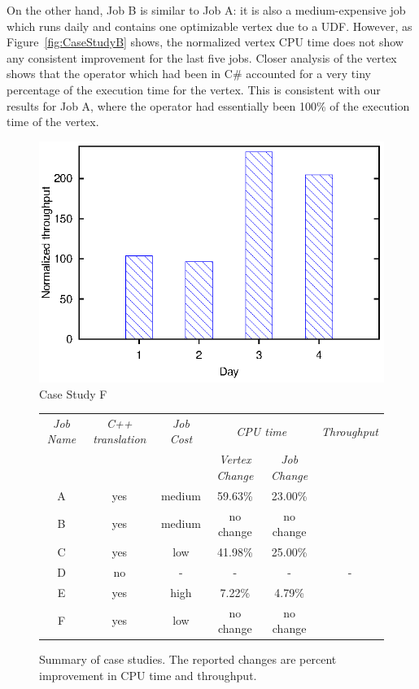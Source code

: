 On the other hand, Job B is similar to Job A: it is also a medium-expensive job which runs daily and contains one optimizable vertex due to a UDF.
However, as Figure~\ref{fig:CaseStudyB} shows, the normalized vertex CPU time does not show any consistent improvement for the last five jobs.
Closer analysis of the vertex shows that the operator which had been in C\# accounted for a very tiny percentage of the execution time for the vertex.
This is consistent with our results for Job A, where the operator had essentially been 100\% of the execution time of the vertex.
\begin{figure}[ht]
\includegraphics{graphs/throughtputF}
\caption{Case Study F \label{fig:CaseStudyF}}
\end{figure}
\begin{figure}[ht]

\begin{tabular}{c|c|c|c|c|c} 
\toprule
  {\em Job Name} & {\em C++ translation}&{\em Job Cost} & \multicolumn{2}{c}{\em CPU time} &  {\em Throughput } \\
  \cmidrule{4-5}  
  & & & {\em Vertex Change} & {\em Job Change} &  \\
  \midrule

A & yes & medium & 59.63\%  & 23.00\% & \todo{}\\
B &yes & medium & no change & no change & \todo{}\\
C & yes & low    & 41.98\%  & 25.00\% & \todo{}\\
D & no & - & - & - & -\\
E & yes & high   & 7.22\%   & 4.79\% & \todo{} \\
F & yes & low & no change & no change & \todo{}\\

\end{tabular}
\caption{Summary of case studies. The reported changes are percent improvement in CPU time and throughput. \label{fig:caseStudySummary}}
\end{figure}

